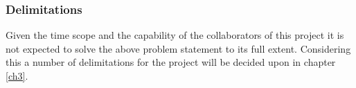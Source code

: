 \subsubsection{Delimitations}
Given the time scope and the capability of the collaborators of this project it is not expected to solve the above problem statement to its full extent. Considering this a number of delimitations for the project will be decided upon in chapter \ref{ch3}.
%
